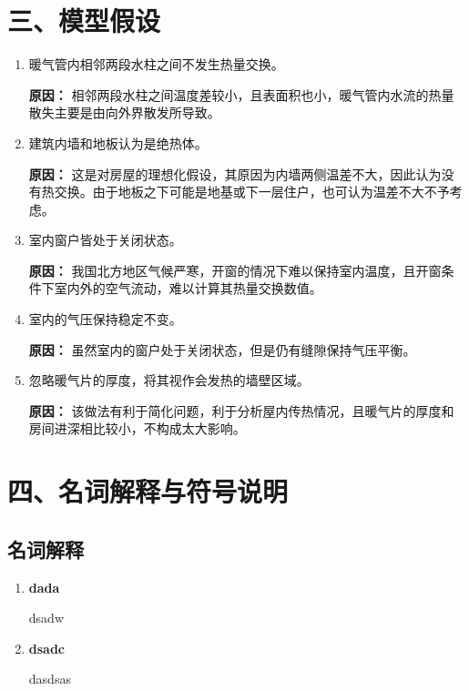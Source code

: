 \documentclass{my_paper}
\begin{document}
\section{三、模型假设}
\begin{enumerate}
    \item 暖气管内相邻两段水柱之间不发生热量交换。
    
    \textbf{原因：}
    相邻两段水柱之间温度差较小，且表面积也小，暖气管内水流的热量散失主要是由向外界散发所导致。

    \item 建筑内墙和地板认为是绝热体。
    
    \textbf{原因：}
    这是对房屋的理想化假设，其原因为内墙两侧温差不大，因此认为没有热交换。由于地板之下可能是地基或下一层住户，也可认为温差不大不予考虑。
    
    \item 室内窗户皆处于关闭状态。
    
    \textbf{原因：}
    我国北方地区气候严寒，开窗的情况下难以保持室内温度，且开窗条件下室内外的空气流动，难以计算其热量交换数值。

    \item 室内的气压保持稳定不变。
    
    \textbf{原因：}
    虽然室内的窗户处于关闭状态，但是仍有缝隙保持气压平衡。

    \item 忽略暖气片的厚度，将其视作会发热的墙壁区域。
    
    \textbf{原因：}
    该做法有利于简化问题，利于分析屋内传热情况，且暖气片的厚度和房间进深相比较小，不构成太大影响。

\end{enumerate}

\section{四、名词解释与符号说明}
\subsection{名词解释}
\begin{enumerate}
    \item \textbf{dada}
    
    dsadw
    
    \item \textbf{dsadc}
    
    dasdsas

    
\end{enumerate}
\end{document}

